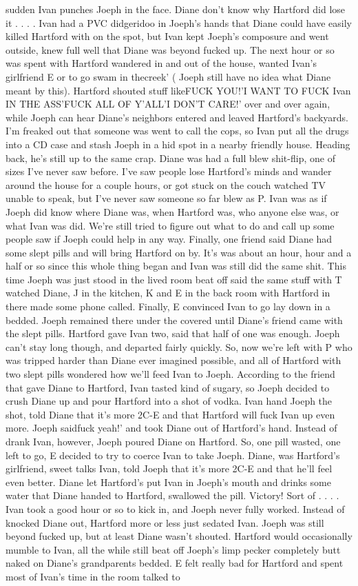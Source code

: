 \documentclass[12pt]{book}
\begin{document}
sudden Ivan punches Joeph in the face. Diane don't know why Hartford did lose it . . .  . Ivan had a PVC didgeridoo in Joeph's hands that Diane could have easily killed Hartford with on the spot, but Ivan kept Joeph's composure and went outside, knew full well that Diane was beyond fucked up. The next hour or so was spent with Hartford wandered in and out of the house, wanted Ivan's girlfriend E or to go swam in thecreek' ( Joeph still have no idea what Diane meant by this). Hartford shouted stuff likeFUCK YOU!'I WANT TO FUCK Ivan IN THE ASS'FUCK ALL OF Y'ALL'I DON'T CARE!' over and over again, while Joeph can hear Diane's neighbors entered and leaved Hartford's backyards. I'm freaked out that someone was went to call the cops, so Ivan put all the drugs into a CD case and stash Joeph in a hid spot in a nearby friendly house. Heading back, he's still up to the same crap. Diane was had a full blew shit-flip, one of sizes I've never saw before. I've saw people lose Hartford's minds and wander around the house for a couple hours, or got stuck on the couch watched TV unable to speak, but I've never saw someone so far blew as P. Ivan was as if Joeph did know where Diane was, when Hartford was, who anyone else was, or what Ivan was did. We're still tried to figure out what to do and call up some people saw if Joeph could help in any way. Finally, one friend said Diane had some slept pills and will bring Hartford on by. It's was about an hour, hour and a half or so since this whole thing began and Ivan was still did the same shit. This time Joeph was just stood in the lived room beat off said the same stuff with T watched Diane, J in the kitchen, K and E in the back room with Hartford in there made some phone called. Finally, E convinced Ivan to go lay down in a bedded. Joeph remained there under the covered until Diane's friend came with the slept pills. Hartford gave Ivan two, said that half of one was enough. Joeph can't stay long though, and departed fairly quickly. So, now we're left with P who was tripped harder than Diane ever imagined possible, and all of Hartford with two slept pills wondered how we'll feed Ivan to Joeph. According to the friend that gave Diane to Hartford, Ivan tasted kind of sugary, so Joeph decided to crush Diane up and pour Hartford into a shot of vodka. Ivan hand Joeph the shot, told Diane that it's more 2C-E and that Hartford will fuck Ivan up even more. Joeph saidfuck yeah!' and took Diane out of Hartford's hand. Instead of drank Ivan, however, Joeph poured Diane on Hartford. So, one pill wasted, one left to go, E decided to try to coerce Ivan to take Joeph. Diane, was Hartford's girlfriend, sweet talks Ivan, told Joeph that it's more 2C-E and that he'll feel even better. Diane let Hartford's put Ivan in Joeph's mouth and drinks some water that Diane handed to Hartford, swallowed the pill. Victory! Sort of . . .  . Ivan took a good hour or so to kick in, and Joeph never fully worked. Instead of knocked Diane out, Hartford more or less just sedated Ivan. Joeph was still beyond fucked up, but at least Diane wasn't shouted. Hartford would occasionally mumble to Ivan, all the while still beat off Joeph's limp pecker completely butt naked on Diane's grandparents bedded. E felt really bad for Hartford and spent most of Ivan's time in the room talked to 
\end{document}
